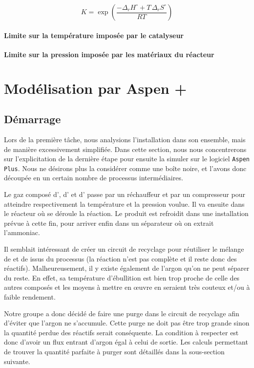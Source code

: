 \documentclass[a4paper, oneside, 12pt]{article}
\begin{document}
\[
K = \exp{\left( \frac{- \Delta_r H^{\circ} + T \, \Delta_r S^{\circ}}{R T}\right)}
\]

\paragraph{Limite sur la température imposée par le catalyseur}

\paragraph{Limite sur la pression imposée par les matériaux du réacteur}

\section{Modélisation par Aspen +}
\subsection{Démarrage}

Lors de la première tâche, nous analysions l'installation dans son ensemble, 
mais de manière excessivement simplifiée. 
Dans cette section, nous nous concentrerons sur l'explicitation de la dernière étape 
pour ensuite la simuler sur le logiciel \texttt{Aspen Plus}. 
Nous ne désirons plus la considérer comme une boîte noire, et l'avons donc découpée 
en un certain nombre de processus intermédiaires. 

Le gaz composé d', d' et d' passe par un réchauffeur 
et par un compresseur pour atteindre respectivement la température et la pression voulue. 
Il va ensuite dans le réacteur où se déroule la réaction.
Le produit est refroidit dans une installation prévue à cette fin, 
pour arriver enfin dans un séparateur où on extrait l'ammoniac.

Il semblait intéressant de créer un circuit de recyclage pour réutiliser 
le mélange de  et de  issus du processus (la réaction n'est pas complète 
et il reste donc des réactifs). Malheureusement, il y existe également de l'argon 
qu'on ne peut séparer du reste. En effet, sa température d'ébullition est bien trop 
proche de celle des autres composés et les moyens à mettre en œuvre en seraient 
très couteux et/ou à faible rendement.

Notre groupe a donc décidé de faire une purge dans le circuit de recyclage afin d'éviter que l'argon ne s'accumule. Cette purge ne doit pas être trop grande sinon la quantité perdue des réactifs serait conséquente. 
La condition à respecter est donc d'avoir un flux entrant d'argon égal à celui de sortie. 
Les calculs permettant de trouver la quantité parfaite à purger 
sont détaillés dans la sous-section suivante.
\end{document}
